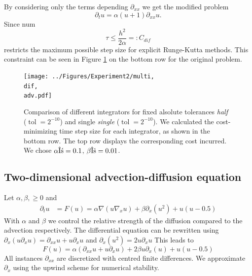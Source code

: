 \documentclass{scrartcl}
\newcommand{\eqdefn}{=\mathrel{\mathop:}}
\begin{document}
%	
	By considering only the terms depending $\partial_{xx}$ we get the modified problem
	\[
		\partial_{t}u = \alpha (u+1)\partial_{xx}u.
	\] 
	Since num
	\[
		\tau \le \frac{h^2}{2\alpha} \eqdefn C_{dif}
	\]
	restricts the maximum possible step size for explicit Runge-Kutta methods. This constraint can be seen in Figure \ref{fig:multi1DNonlinear} on the bottom row for the original problem.
	\begin{figure}[H]
		\newcommand{\dif}{\detokenize{α}=0.1}
		\newcommand{\adv}{\detokenize{β}=0.01}
		\centering
		\texttt{[image: ../Figures/Experiment2/multi, \\dif, \\adv.pdf]}
		\caption{Comparison of different integrators for fixed alsolute tolerances \textit{half} ($\operatorname{tol} = 2^{-10}$) and single \textit{single} ($\operatorname{tol} = 2^{-10}$). We calculated the cost-minimizing time step size for each integrator, as shown in the bottom row. The top row displays the corresponding cost incurred. We chose $\alpha\dif$, $\beta\adv$.}
		\label{fig:multi1DNonlinear}
	\end{figure}
	
	\subsection{Two-dimensional advection-diffusion equation}
	Let $\alpha,\beta,\ge 0$ and 
	\begin{align*}
	\partial_tu &= F(u) = \alpha\nabla(u\nabla_xu) + \beta\partial_x(u^2) + u(u-0.5)
	\end{align*}
	With $\alpha$ and $\beta$ we control the relative strength of the diffusion compared to the advection respectively. The differential equation can be rewritten using $\partial_x(u\partial_xu) = \partial_{xx}u + u\partial_{x}u$ and $\partial_x(u^2) = 2u\partial_{x}u$
	This leads to
	\[
	F(u) = 
	\alpha(\partial_{xx}u + u\partial_{x}u) 
	+ 2\beta u\partial_x(u) 
	+ u(u-0.5)
	\]
	All instances $\partial_{xx}$ are discretized with centred finite differences. We approximate $\partial_{x}$ using the upwind scheme for numerical stability.
	
\end{document}
